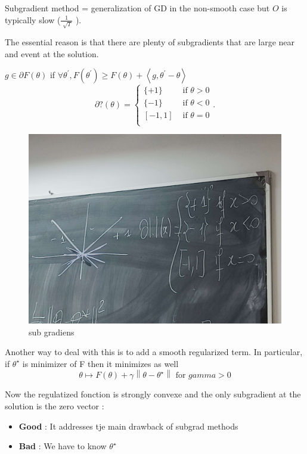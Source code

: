 \begin{note}
    Subgradient method = generalization of GD in the non-smooth case but $ O $ is typically slow ($ \frac{1}{\sqrt[]{T}} $ ). 

    The essential reason is that there are plenty of subgradients that are large near and event at the solution.

    $ g \in \partial F(\theta ) $ if $ \forall \theta ^\prime, F(\theta ^\prime ) \geq F(\theta ) +  \left\langle g, \theta ^\prime - \theta  \right\rangle $ 
    \[
        \partial ? (\theta ) = \begin{cases}
            \{ +1 \}  &\text{ if } \theta > 0\\
            \{ -1 \}  &\text{ if } \theta < 0\\
            [-1 , 1]  &\text{ if } \theta = 0\\
        \end{cases} 
    .\]
    
    \begin{figure}[!h]
        \centering
        \includegraphics[width=.65\textwidth]{figs/subgradients.jpg}
        \caption{sub gradiens}
        \label{truc}
    \end{figure}

    Another way to deal with this is to add a smooth regularized term. In particular, if $\theta ^{\star }$ is minimizer of F then it minimizes as well
    \[ \theta  \mapsto F(\theta) + \gamma \left\| \theta - \theta ^{\star } \right\| \text{ for } gamma > 0  \]

    Now the regulatized fonction is strongly convexe and the only subgradient at the solution is the zero vector : \begin{itemize}
        \item \textbf{Good} : It addresses tje main drawback of subgrad methods
        \item \textbf{Bad} : We have to know $ \theta ^\star  $ 
    \end{itemize}


\end{note}
